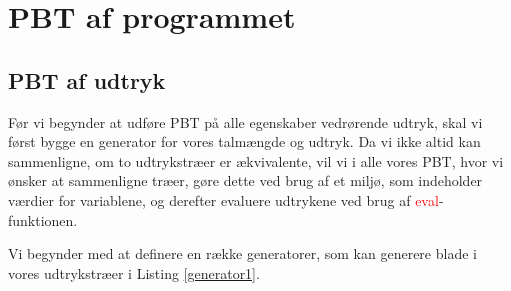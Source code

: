 \section{PBT af programmet} 
\subsection{PBT af udtryk}
Før vi begynder at udføre PBT på alle egenskaber vedrørende udtryk, skal vi først bygge en generator for vores talmængde og udtryk. Da vi ikke altid kan sammenligne, om to udtrykstræer er ækvivalente, vil vi i alle vores PBT, hvor vi ønsker at sammenligne træer, gøre dette ved brug af et miljø, som indeholder værdier for variablene, og derefter evaluere udtrykene ved brug af \textcolor{red}{eval}-funktionen.

Vi begynder med at definere en række generatorer, som kan generere blade i vores udtrykstræer i Listing \ref{generator1}.



